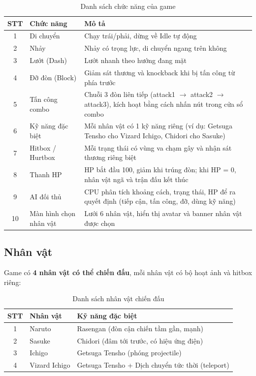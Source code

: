\documentclass[a4paper,12pt]{report}
\begin{document}
\begin{table}[H]
\centering
\caption{Danh sách chức năng của game}
\begin{tabular}{c p{4cm} p{8cm}}
\toprule
\textbf{STT} & \textbf{Chức năng} & \textbf{Mô tả} \\
\midrule
1 & Di chuyển & Chạy trái/phải, dừng về Idle tự động \\
2 & Nhảy & Nhảy có trọng lực, di chuyển ngang trên không \\
3 & Lướt (Dash) & Lướt nhanh theo hướng đang mặt \\
4 & Đỡ đòn (Block) & Giảm sát thương và knockback khi bị tấn công từ phía trước \\
5 & Tấn công combo & Chuỗi 3 đòn liên tiếp (attack1 $\to$ attack2 $\to$ attack3), kích hoạt bằng cách nhấn nút trong cửa sổ combo \\
6 & Kỹ năng đặc biệt & Mỗi nhân vật có 1 kỹ năng riêng (ví dụ: Getsuga Tensho cho Vizard Ichigo, Chidori cho Sasuke) \\
7 & Hitbox / Hurtbox & Mỗi trạng thái có vùng va chạm gây và nhận sát thương riêng biệt \\
8 & Thanh HP & HP bắt đầu 100, giảm khi trúng đòn; khi HP = 0, nhân vật ngã và trận đấu kết thúc \\
9 & AI đối thủ & CPU phân tích khoảng cách, trạng thái, HP để ra quyết định (tiếp cận, tấn công, đỡ, dùng kỹ năng) \\
10 & Màn hình chọn nhân vật & Lưới 6 nhân vật, hiển thị avatar và banner nhân vật được chọn \\
\bottomrule
\end{tabular}
\end{table}

\subsection{Nhân vật}

Game có \textbf{4 nhân vật có thể chiến đấu}, mỗi nhân vật có bộ hoạt ảnh và hitbox riêng:

\begin{table}[H]
\centering
\caption{Danh sách nhân vật chiến đấu}
\begin{tabular}{c l l}
\toprule
\textbf{STT} & \textbf{Nhân vật} & \textbf{Kỹ năng đặc biệt} \\
\midrule
1 & Naruto & Rasengan (đòn cận chiến tầm gần, mạnh) \\
2 & Sasuke & Chidori (đâm tới trước, có hiệu ứng điện) \\
3 & Ichigo & Getsuga Tensho (phóng projectile) \\
4 & Vizard Ichigo & Getsuga Tensho + Dịch chuyển tức thời (teleport) \\
\bottomrule
\end{tabular}
\end{table}
\end{document}
